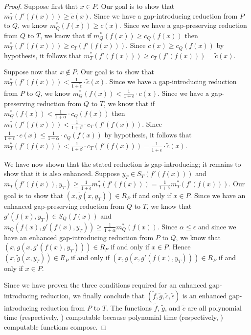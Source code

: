 \documentclass[]{article}
\begin{document}
\begin{proof}
  Suppose first that $x \in P$.
  Our goal is to show that $m^*_T(f'(f(x))) \geq \tilde{c}(x)$.
  Since we have a gap-introducing reduction from $P$ to $Q$, we know $m^*_Q(f(x)) \geq c(x)$.
  Since we have a gap-preserving reduction from $Q$ to $T$, we know that if $m^*_Q(f(x)) \geq c_Q(f(x))$ then $m^*_T(f'(f(x))) \geq c_T(f'(f(x)))$.
  Since $c(x) \geq c_Q(f(x))$ by hypothesis, it follows that $m^*_T(f'(f(x))) \geq c_T(f'(f(x))) = \tilde{c}(x)$.

  Suppose now that $x \notin P$.
  Our goal is to show that $m^*_T(f'(f(x))) < \frac{1}{1 + \tilde{\epsilon}} \cdot \tilde{c}(x)$.
  Since we have a gap-introducing reduction from $P$ to $Q$, we know $m^*_Q(f(x)) < \frac{1}{1 + \epsilon} \cdot c(x)$.
  Since we have a gap-preserving reduction from $Q$ to $T$, we know that if $m^*_Q(f(x)) < \frac{1}{1 + \alpha} \cdot c_Q(f(x))$ then $m^*_T(f'(f(x))) < \frac{1}{1 + \beta} \cdot c_T(f'(f(x)))$.
  Since $\frac{1}{1 + \epsilon} \cdot c(x) \leq \frac{1}{1 + \alpha} \cdot c_Q(f(x))$ by hypothesis, it follows that $m^*_T(f'(f(x))) < \frac{1}{1 + \beta} \cdot c_T(f'(f(x))) = \frac{1}{1 + \tilde{\epsilon}} \cdot \tilde{c}(x)$.

  We have now shown that the stated reduction is gap-introducing; it remains to show that it is also enhanced.
  Suppose $y_T \in S_T(f'(f(x)))$ and $m_T(f'(f(x)), y_T) \geq \frac{1}{1 + \tilde{\epsilon}} m^*_T(f'(f(x))) = \frac{1}{1 + \beta} m^*_T(f'(f(x)))$.
  Our goal is to show that $(x, \tilde{g}(x, y_T)) \in R_P$ if and only if $x \in P$.
  Since we have an enhanced gap-preserving reduction from $Q$ to $T$, we know that $g'(f(x), y_T) \in S_Q(f(x))$ and $m_Q(f(x), g'(f(x), y_T)) \geq \frac{1}{1 + \alpha} m^*_Q(f(x))$.
  Since $\alpha \leq \epsilon$ and since we have an enhanced gap-introducing reduction from $P$ to $Q$, we know that $(x, g(x, g'(f(x), y_T))) \in R_P$ if and only if $x \in P$.
  Hence $(x, \tilde{g}(x, y_T)) \in R_P$ if and only if $(x, g(x, g'(f(x), y_T))) \in R_P$ if and only if $x \in P$.

  Since we have proven the three conditions required for an enhanced gap-introducing reduction, we finally conclude that $(\tilde{f}, \tilde{g}, \tilde{c}, \tilde{\epsilon})$ is an enhanced gap-introducing reduction from $P$ to $T$.
  The functions $\tilde{f}$, $\tilde{g}$, and $\tilde{c}$ are all polynomial time (respectively, \NC) computable because polynomial time (respectively, \NC) computable functions compose.
\end{proof}
\end{document}
